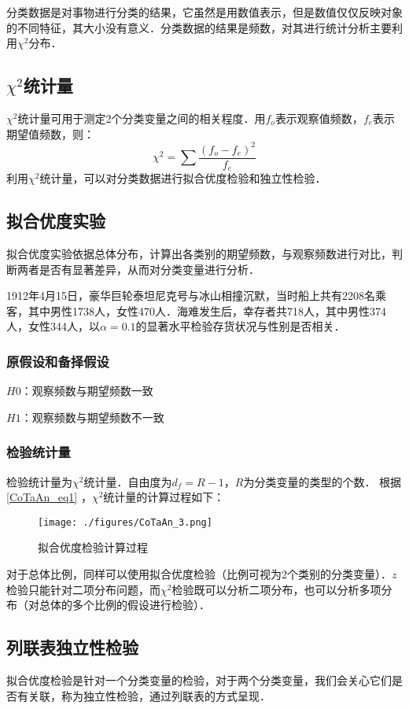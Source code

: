分类数据是对事物进行分类的结果，它虽然是用数值表示，但是数值仅仅反映对象的不同特征，其大小没有意义．分类数据的结果是频数，对其进行统计分析主要利用$\chi^2$分布．
\subsection{$\chi^2$统计量}
$\chi^2$统计量可用于测定2个分类变量之间的相关程度．用$f_o$表示观察值频数，$f_e$表示期望值频数，则：
\begin{equation}\label{CoTaAn_eq1}
\chi^2 =  \sum \frac {(f_o-f_e)^2}{f_e}
\end{equation}
利用$\chi^2$统计量，可以对分类数据进行拟合优度检验和独立性检验．
\subsection{拟合优度实验}
拟合优度实验依据总体分布，计算出各类别的期望频数，与观察频数进行对比，判断两者是否有显著差异，从而对分类变量进行分析．
\begin{example}{}
1912年4月15日，豪华巨轮泰坦尼克号与冰山相撞沉默，当时船上共有2208名乘客，其中男性1738人，女性470人．海难发生后，幸存者共718人，其中男性374人，女性344人，以$\alpha=0.1$的显著水平检验存货状况与性别是否相关．
\subsubsection{原假设和备择假设}
$H0$：观察频数与期望频数一致

$H1$：观察频数与期望频数不一致
\subsubsection{检验统计量}
检验统计量为$\chi^2$统计量．自由度为$d_f = R-1$，$R$为分类变量的类型的个数．
根据\autoref{CoTaAn_eq1} ，$\chi^2$统计量的计算过程如下：
\begin{figure}[ht]
\centering
\texttt{[image: ./figures/CoTaAn\_3.png]}
\caption{拟合优度检验计算过程} \label{CoTaAn_fig3}
\end{figure}
\end{example}

对于总体比例，同样可以使用拟合优度检验（比例可视为2个类别的分类变量）．$z$检验只能针对二项分布问题，而$\chi^2$检验既可以分析二项分布，也可以分析多项分布（对总体的多个比例的假设进行检验）．

\subsection{列联表独立性检验}
拟合优度检验是针对一个分类变量的检验，对于两个分类变量，我们会关心它们是否有关联，称为独立性检验，通过列联表的方式呈现．
